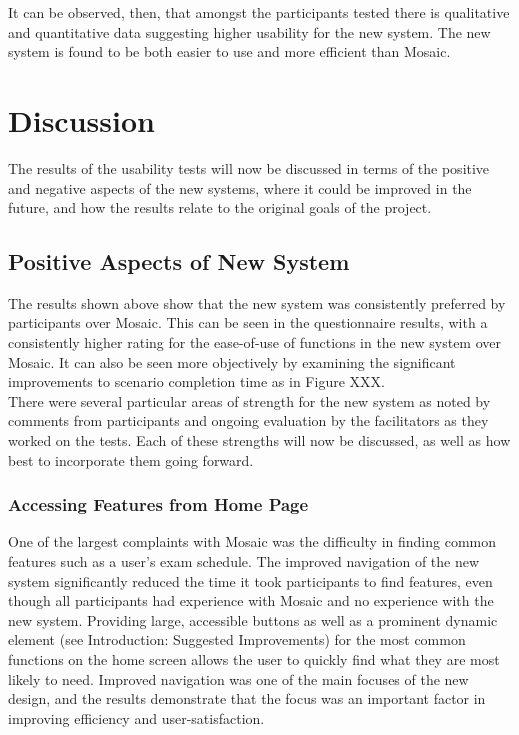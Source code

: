 \documentclass[10pt]{article}
\begin{document}
\begin{multicols}{2}
It can be observed, then,  that amongst the participants tested there is qualitative and quantitative  data suggesting higher usability for the new system. The new system is found to be both easier to use and more efficient than Mosaic.

\section*{Discussion}
The results of the usability tests will now be discussed in terms of the positive and negative aspects of the new systems, where it could be improved in the future, and how the results relate to the original goals of the project.

\subsection*{Positive Aspects of New System}
The results shown above show that the new system was consistently preferred by participants over Mosaic. This can be seen in the questionnaire results, with a consistently higher rating for the ease-of-use of functions in the new system over Mosaic. It can also be seen more objectively by examining the significant improvements to scenario completion time as in Figure XXX.\\

There were several particular areas of strength for the new system as noted by comments from participants and ongoing evaluation by the facilitators as they worked on the tests. Each of these strengths will now be discussed, as well as how best to incorporate them going forward.

\subsubsection*{Accessing Features from Home Page}
One of the largest complaints with Mosaic was the difficulty in finding common features such as a user's exam schedule. The improved navigation of the new system significantly reduced the time it took participants to find features, even though all participants had experience with Mosaic and no experience with the new system. Providing large, accessible buttons as well as a prominent dynamic element (see Introduction: Suggested Improvements) for the most common functions on the home screen allows the user to quickly find what they are most likely to need. Improved navigation was one of the main focuses of the new design, and the results demonstrate that the focus was an important factor in improving efficiency and user-satisfaction.


\end{multicols}
\end{document}
